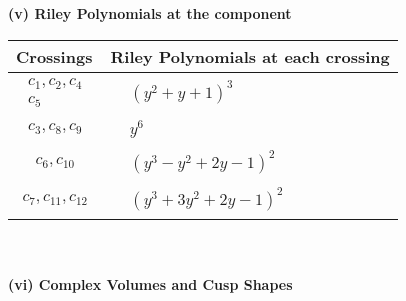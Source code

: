\documentclass[1p]{elsarticle_modified}
\theoremstyle{definition}
\begin{document}
\newpage\renewcommand{\arraystretch}{1}
\flushleft \textbf{(v) Riley Polynomials at the component}\newline \\
\begin{tabular}{m{50pt}|m{274pt}}
Crossings & \hspace{64pt}Riley Polynomials at each crossing \\
\hline $$\begin{aligned}c_{1},c_{2},c_{4}\\c_{5}\end{aligned}$$&$\begin{aligned}
&(y^2+y+1)^3
\end{aligned}$\\
\hline $$\begin{aligned}c_{3},c_{8},c_{9}\end{aligned}$$&$\begin{aligned}
&y^6
\end{aligned}$\\
\hline $$\begin{aligned}c_{6},c_{10}\end{aligned}$$&$\begin{aligned}
&(y^3- y^2+2 y-1)^2
\end{aligned}$\\
\hline $$\begin{aligned}c_{7},c_{11},c_{12}\end{aligned}$$&$\begin{aligned}
&(y^3+3 y^2+2 y-1)^2
\end{aligned}$\\
\hline
\end{tabular}\\~\\
\newpage\flushleft \textbf{(vi) Complex Volumes and Cusp Shapes}
\end{document}
